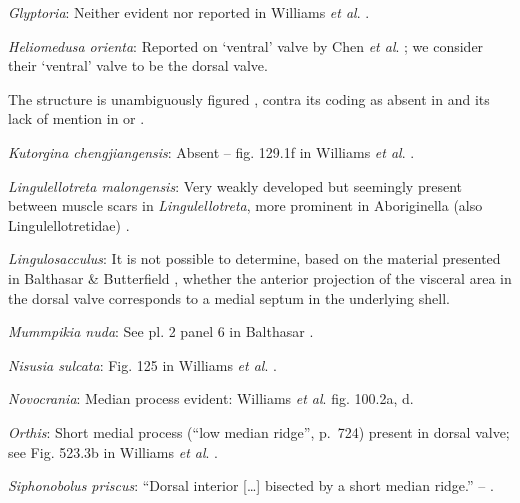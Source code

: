 \documentclass[openany]{book}
\theoremstyle{definition}
\theoremstyle{definition}
\theoremstyle{definition}
\theoremstyle{remark}
\begin{document}
\hypertarget{Glyptoria-coding-31}{}
\emph{Glyptoria}: Neither evident nor reported in Williams \emph{et al}.
\citeyearpar{Williams2000LinguliformeaCraniiformea}.

\hypertarget{Heliomedusa_orienta-coding-31}{}
\emph{Heliomedusa orienta}: Reported on `ventral' valve by Chen \emph{et
al}. \citeyearpar{Chen2007Reinterpretationof}; we consider their
`ventral' valve to be the dorsal valve.

The structure is unambiguously figured \citep[e.g.~fig. 5.1
in][]{Chen2007Reinterpretationof}, contra its coding as absent in
\citet{Williams2000LinguliformeaCraniiformea} and its lack of mention in
\citet{Williams2007Supplement} or \citet{Zhang2009Architectureand}.

\hypertarget{Kutorgina_chengjiangensis-coding-31}{}
\emph{Kutorgina chengjiangensis}: Absent -- fig. 129.1f in Williams
\emph{et al}. \citeyearpar{Williams2000LinguliformeaCraniiformea}.

\hypertarget{Lingulellotreta_malongensis-coding-31}{}
\emph{Lingulellotreta malongensis}: Very weakly developed but seemingly
present between muscle scars in \emph{Lingulellotreta}, more prominent
in Aboriginella (also Lingulellotretidae) \citep[fig.
34]{Williams2000LinguliformeaCraniiformea}.

\hypertarget{Lingulosacculus-coding-31}{}
\emph{Lingulosacculus}: It is not possible to determine, based on the
material presented in Balthasar \& Butterfield
\citeyearpar{Balthasar2009EarlyCambrian}, whether the anterior
projection of the visceral area in the dorsal valve corresponds to a
medial septum in the underlying shell.

\hypertarget{Mummpikia_nuda-coding-31}{}
\emph{Mummpikia nuda}: See pl. 2 panel 6 in Balthasar
\citeyearpar{Balthasar2008iMummpikia}.

\hypertarget{Nisusia_sulcata-coding-31}{}
\emph{Nisusia sulcata}: Fig. 125 in Williams \emph{et al}.
\citeyearpar{Williams2000LinguliformeaCraniiformea}.

\hypertarget{Novocrania-coding-31}{}
\emph{Novocrania}: Median process evident: Williams \emph{et al}.
\citeyearpar{Williams2000LinguliformeaCraniiformea} fig. 100.2a, d.

\hypertarget{Orthis-coding-31}{}
\emph{Orthis}: Short medial process (``low median ridge'', p.~724)
present in dorsal valve; see Fig. 523.3b in Williams \emph{et al}.
\citeyearpar{Williams2000LinguliformeaCraniiformea}.

\hypertarget{Siphonobolus_priscus-coding-31}{}
\emph{Siphonobolus priscus}: ``Dorsal interior {[}\ldots{}{]} bisected
by a short median ridge.'' -- \citet{Popov2009Earlyontogeny}.
\end{document}
